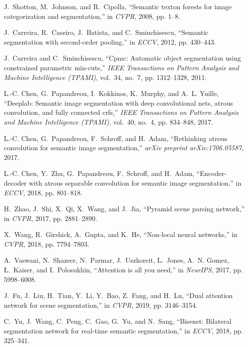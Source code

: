 \documentclass[10.5pt,twocolumn,journal,letterpaper]{IEEEtran}
\begin{document}
\begin{thebibliography}{10}
	J.~Shotton, M.~Johnson, and R.~Cipolla, ``Semantic texton forests for image
	categorization and segmentation,'' in \emph{CVPR}, 2008, pp. 1--8.
	
	J.~Carreira, R.~Caseiro, J.~Batista, and C.~Sminchisescu, ``Semantic
	segmentation with second-order pooling,'' in \emph{ECCV}, 2012, pp. 430--443.
	
	J.~Carreira and C.~Sminchisescu, ``Cpmc: Automatic object segmentation using
	constrained parametric min-cuts,'' \emph{IEEE Transactions on Pattern
		Analysis and Machine Intelligence (TPAMI)}, vol.~34, no.~7, pp. 1312--1328,
	2011.
	
	L.-C. Chen, G.~Papandreou, I.~Kokkinos, K.~Murphy, and A.~L. Yuille, ``Deeplab:
	Semantic image segmentation with deep convolutional nets, atrous convolution,
	and fully connected crfs,'' \emph{IEEE Transactions on Pattern Analysis and
		Machine Intelligence (TPAMI)}, vol.~40, no.~4, pp. 834--848, 2017.
	
	L.-C. Chen, G.~Papandreou, F.~Schroff, and H.~Adam, ``Rethinking atrous
	convolution for semantic image segmentation,'' \emph{arXiv preprint
		arXiv:1706.05587}, 2017.
	
	L.-C. Chen, Y.~Zhu, G.~Papandreou, F.~Schroff, and H.~Adam, ``Encoder-decoder
	with atrous separable convolution for semantic image segmentation,'' in
	\emph{ECCV}, 2018, pp. 801--818.
	
	H.~Zhao, J.~Shi, X.~Qi, X.~Wang, and J.~Jia, ``Pyramid scene parsing network,''
	in \emph{CVPR}, 2017, pp. 2881--2890.
	
	X.~Wang, R.~Girshick, A.~Gupta, and K.~He, ``Non-local neural networks,'' in
	\emph{CVPR}, 2018, pp. 7794--7803.
	
	A.~Vaswani, N.~Shazeer, N.~Parmar, J.~Uszkoreit, L.~Jones, A.~N. Gomez,
	{\L}.~Kaiser, and I.~Polosukhin, ``Attention is all you need,'' in
	\emph{NeurIPS}, 2017, pp. 5998--6008.
	
	J.~Fu, J.~Liu, H.~Tian, Y.~Li, Y.~Bao, Z.~Fang, and H.~Lu, ``Dual attention
	network for scene segmentation,'' in \emph{CVPR}, 2019, pp. 3146--3154.
	
	C.~Yu, J.~Wang, C.~Peng, C.~Gao, G.~Yu, and N.~Sang, ``Bisenet: Bilateral
	segmentation network for real-time semantic segmentation,'' in \emph{ECCV},
	2018, pp. 325--341.
	

\end{thebibliography}
\end{document}
